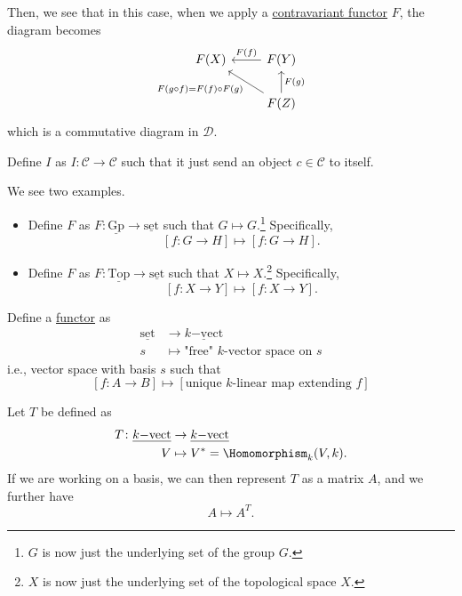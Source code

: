 Then, we see that in this case, when we apply a \hyperref[def:contravariant-functor]{contravariant functor} \(F\), the diagram becomes
\[
	\begin{tikzcd}
		F(X)  & F(Y)\ar[l, "F(f)"']\\
		& F(Z)\ar[lu, "F(g\circ f)=F(f)\circ F(g)"]\ar[u, "F(g)"']
	\end{tikzcd}
\]
which is a commutative diagram in \(\mathscr{D}\).
\begin{eg}
	Define \(I\) as \(I\colon \mathscr{C} \to \mathscr{C}\) such that it just send an object \(c\in \mathscr{C}\) to itself.
\end{eg}
\begin{eg}\label{eg:forgetful-functor}
	We see two examples.
	\begin{itemize}
		\item Define \(F\) as \(F\colon \underline{\mathrm{Gp}}\to \underline{\mathrm{set}}\) such that \(G\mapsto G\).\footnote{\(G\) is now just the underlying set of the group \(G\).}
		      Specifically,
		      \[
			      \left[f\colon G\to H\right]\mapsto \left[f\colon G\to H\right].
		      \]
		\item Define \(F\) as \(F\colon \underline{\mathrm{Top}}\to \underline{\mathrm{set}}\) such that \(X\mapsto X\).\footnote{\(X\) is now just the underlying set of the topological space \(X\).}
		      Specifically,
		      \[
			      \left[f\colon X\to Y\right]\mapsto \left[f\colon X\to Y\right].
		      \]
	\end{itemize}
\end{eg}
\begin{eg}\label{eg:free-functor}
	Define a \hyperref[def:functor]{functor} as
	\[
		\begin{split}
			\underline{\mathrm{set}}&\to \underline{k\mathrm{-vect}}  \\
			s&\mapsto \text{"free" \(k\)-vector space on \(s\)}
		\end{split}
	\]
	i.e., vector space with basis \(s\) such that
	\[
		\left[f\colon A\to B\right]\mapsto \left[\text{unique \(k\)-linear map extending \(f\)}\right]
	\]
\end{eg}
\begin{eg}
	Let \(T\) be defined as
	\[
		\begin{split}
			T\colon \underline{k\mathrm{-vect}}&\to \underline{k\mathrm{-vect}}  \\
			V&\mapsto V^{*} = \Homomorphism _k(V, k).
		\end{split}
	\]
	If we are working on a basis, we can then represent \(T\) as a matrix \(A\), and we further have
	\[
		A\mapsto A^{T}.
	\]
\end{eg}

